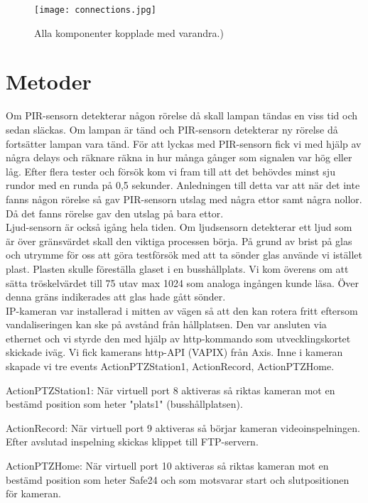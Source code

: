 \begin{figure}[h]

  \texttt{[image: connections.jpg]}
  \caption{Alla komponenter kopplade med varandra.)}
  \label{fig:connections}
\end{figure}
\clearpage



\section{Metoder} 
Om PIR-sensorn detekterar någon rörelse då skall lampan tändas en viss tid och sedan släckas. Om lampan är tänd och PIR-sensorn detekterar ny rörelse då fortsätter lampan vara tänd. För att lyckas med PIR-sensorn fick vi med hjälp av några delays och räknare räkna in hur många gånger som signalen var hög eller låg. Efter flera tester och försök kom vi fram till att det behövdes minst sju rundor med en runda på 0,5 sekunder. Anledningen till detta var att när det inte fanns någon rörelse så gav PIR-sensorn utslag med några ettor samt några nollor. Då det fanns rörelse gav den utslag på bara ettor.\\

 Ljud-sensorn är också igång hela tiden. Om ljudsensorn detekterar ett ljud som är över gränsvärdet skall den viktiga processen börja. På grund av brist på glas och utrymme för oss att göra testförsök med att ta sönder glas använde vi istället plast. Plasten skulle föreställa glaset i en busshållplats. Vi kom överens om att sätta tröskelvärdet till 75 utav max 1024 som analoga ingången kunde läsa. Över denna gräns indikerades att glas hade gått sönder.\\

IP-kameran var installerad i mitten av vägen så att den kan rotera fritt eftersom vandaliseringen kan ske på avstånd från hållplatsen. Den var ansluten via ethernet och vi styrde den med hjälp av http-kommando som utvecklingskortet skickade iväg. Vi fick kamerans http-API (VAPIX) från Axis. Inne i kameran skapade vi tre events ActionPTZStation1, ActionRecord, ActionPTZHome.

ActionPTZStation1: När virtuell port 8 aktiveras så riktas kameran mot en bestämd position som  heter "plats1" (busshållplatsen).

ActionRecord: När virtuell port 9 aktiveras så börjar kameran videoinspelningen. Efter avslutad inspelning skickas klippet till FTP-servern.

ActionPTZHome: När virtuell port 10 aktiveras så riktas kameran mot en bestämd position som heter Safe24 och som motsvarar start och slutpositionen för kameran.


